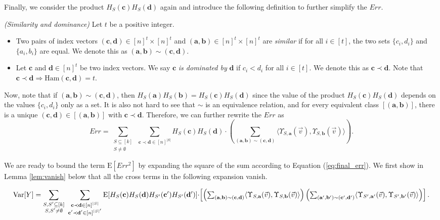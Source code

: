 \def\draft{0}  \documentclass[proceedings]{stacs}
\theoremstyle{plain}\newtheorem{satz}[thm]{Satz}
\theoremstyle{definition}\newtheorem{crucial}[thm]{Crucial Definition}
\newcommand{\vecv}{{\vec{v}} }
\newcommand{\bfa}{{\mathbf a} }
\newcommand{\bfb}{{\mathbf b} }
\newcommand{\bfc}{{\mathbf c} }
\newcommand{\bfd}{{\mathbf d} }
\newcommand{\Var}{{\mathrm{Var}} }
\newcommand{\E}{{\mathrm{E}} }
\begin{document}
Finally, we consider the product $H_S(\bfc)H_S(\bfd)$ again and introduce the following definition to further simplify  the $Err$.



\begin{definition}\label{def:similar pairs} \emph{(Similarity and dominance)}
Let $t$ be a positive integer.
\begin{itemize}
\item Two pairs of index vectors $(\bfc, \bfd) \in [n]^t \times [n]^t$ and $(\bfa, \bfb) \in [n]^t \times [n]^t$ are \emph{similar} if for all $i\in [t]$, the two sets $\{c_i, d_i\}$ and $\{a_i, b_i\}$ are equal. We denote this as $(\bfa, \bfb) \sim (\bfc, \bfd)$.

\item Let $\bfc$ and $\bfd \in [n]^t$ be two index vectors. We say $\bfc$ \emph{is dominated by} $\bfd$ if $c_i < d_i$ for all $i \in [t]$. We denote this as $\bfc \prec \bfd$. Note that $\bfc \prec \bfd \Rightarrow \mathrm{Ham}(\bfc, \bfd) = t$.
\end{itemize}
\end{definition}

Now, note that if $(\bfa, \bfb) \sim (\bfc, \bfd)$, then $H_S(\bfa)H_S(\bfb) = H_S(\bfc)H_S(\bfd)$ since the value of the product  $H_S(\bfc)H_S(\bfd)$ depends on the values $\{c_i, d_i\}$ only as a set. It is also not hard to see that  $\sim$ is an equivalence relation, and for every equivalent class $[(\bfa,\bfb)]$, there is a unique $(\bfc,\bfd) \in [(\bfa,\bfb)]$ with $\bfc \prec \bfd$. Therefore, we can further rewrite the $Err$ as
\begin{equation}\label{eq:final_err}
Err = \sum_{\substack{S \subseteq [k] \\S \neq \emptyset}}\  \sum_{\bfc \prec \bfd \in [n]^{|S|}}   H_S(\bfc)H_S(\bfd)\cdot \left( \sum_{(\bfa,\bfb) \sim (\bfc, \bfd)} \langle \Upsilon_{S,\bfa}(\vecv),   \Upsilon_{S,\bfb}(\vecv) \rangle \right).
\end{equation}

We are ready to bound the term $\mathrm E[Err^2]$ by expanding the square of the sum according to Equation (\ref{eq:final_err}). We first show in Lemma \ref{lem:vanish} below that all the cross terms in the following expansion vanish.

\begin{equation}\label{eq:expand_var}
\Var[Y] = \sum_{\substack{S,S' \subseteq [k] \\S, S' \neq \emptyset}}\  \sum_{\substack{\bfc \prec \bfd \in [n]^{|S|} \\  \bfc' \prec \bfd' \in [n]^{|S|'}}} \E[ H_S(\bfc)H_S(\bfd)H_{S'}(\bfc')H_{S'}(\bfd')]  \cdot
$$
$$
\left[\left(\sum_{(\bfa,\bfb) \sim (\bfc, \bfd)} \langle \Upsilon_{S,\bfa}(\vecv),   \Upsilon_{S,\bfb}(\vecv) \rangle \right)
\left(\sum_{(\bfa',\bfb') \sim (\bfc', \bfd')} \langle \Upsilon_{S',\bfa'}(\vecv),   \Upsilon_{S',\bfb'}(\vecv) \rangle \right)
\right].
\end{equation}
\end{document}
